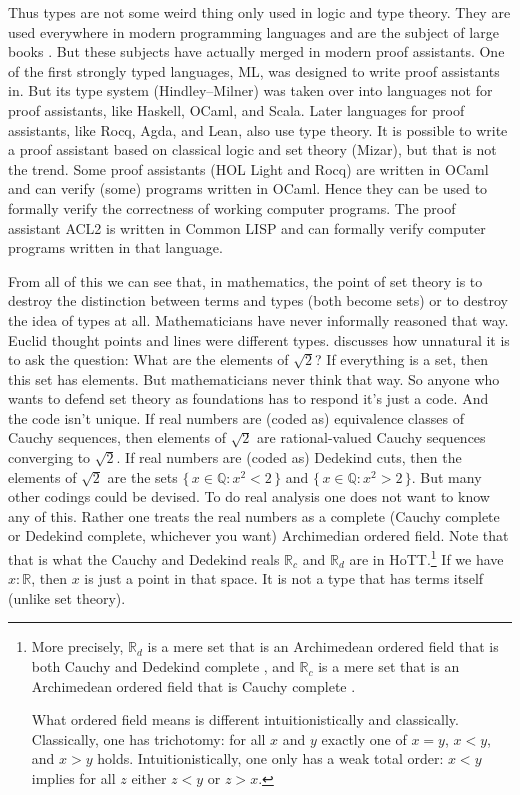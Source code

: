 \documentclass[11pt]{article}
\newcommand{\set}[1]{\{\,#1\,\}}
\newcommand{\real}{\mathbb{R}}
\newcommand{\rats}{\mathbb{Q}}
\begin{document}
Thus types are not some weird thing only used in logic and type theory.
They are used everywhere in modern programming languages and are the
subject of large books \citep{pierce}.
But these subjects have actually merged in modern proof assistants.
One of the first strongly typed languages, ML, was designed to write proof
assistants in.  But its type system (Hindley–Milner) was taken over into
languages not for proof assistants, like Haskell, OCaml, and Scala.
Later languages for proof assistants, like Rocq, Agda, and Lean,
also use type theory.  It is possible to write a proof assistant based
on classical logic and set theory (Mizar), but that is not the trend.
Some proof assistants (HOL Light and Rocq) are written in OCaml and
can verify (some) programs written in OCaml.  Hence they can be used
to formally verify the correctness of working computer programs.
The proof assistant ACL2 is written in Common LISP and can formally
verify computer programs written in that language.

From all of this we can see that, in mathematics, the point of set theory
is to destroy the distinction between terms and types (both become sets)
or to destroy the idea of types at all.  Mathematicians have never informally
reasoned that way.  Euclid thought points and lines were different types.
\citet{leinster} discusses how unnatural it is to ask the question:
What are the elements of $\sqrt{2}$?  If everything is a set, then this set
has elements.  But mathematicians never think that way.  So anyone who
wants to defend set theory as foundations has to respond it's just a code.
And the code isn't unique.  If real numbers are (coded as) equivalence
classes of Cauchy sequences, then elements of $\sqrt{2}$ are
rational-valued Cauchy sequences converging to $\sqrt{2}$.  If real numbers
are (coded as) Dedekind cuts, then the elements of $\sqrt{2}$ are the
sets $\set{ x \in \rats : x^2 < 2 }$ and $\set{ x \in \rats : x^2 > 2 }$.
But many other codings could be devised.
To do real analysis one does not want to know any of this.  Rather one
treats the real numbers as a complete (Cauchy complete or Dedekind complete,
whichever you want) Archimedian ordered field.  Note that that is what
the Cauchy and Dedekind reals $\real_c$ and $\real_d$ are
in HoTT.\footnote{More precisely, $\real_d$ is a mere set
that is an Archimedean ordered field 
that is both Cauchy and Dedekind complete , and $\real_c$ is a mere set
 that is an Archimedean ordered field
 that is Cauchy complete
.

What ordered field means  is different
intuitionistically and classically.
Classically, one has trichotomy: for all $x$ and $y$
exactly one of $x = y$, $x < y$, and $x > y$ holds.
Intuitionistically, one only has a weak total order: $x < y$ implies for all
$z$ either $z < y$ or $z > x$.}
If we have $x : \real$, then $x$ is just a point in that space.
It is not a type that has terms itself (unlike set theory).
\end{document}
